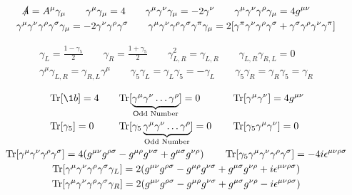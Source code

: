 \begin{gather*}
    \slashed{A} = A^\mu\gamma_\mu
    \qquad
    \gamma^\mu\gamma_\mu = 4
    \qquad
    \gamma^\mu\gamma^\nu\gamma_\mu = -2\gamma^\nu
    \qquad
    \gamma^\mu\gamma^\nu\gamma^\rho\gamma_\mu = 4g^{\mu\nu}
    \qquad
    \\
    \gamma^\mu\gamma^\nu\gamma^\rho\gamma^\sigma\gamma_\mu = -2\gamma^\nu\gamma^\rho\gamma^\sigma
    \qquad
    \gamma^\mu\gamma^\nu\gamma^\rho\gamma^\sigma\gamma^\pi\gamma_\mu = 2\qty[\gamma^\pi\gamma^\nu\gamma^\rho\gamma^\sigma + \gamma^\sigma\gamma^\rho\gamma^\nu\gamma^\pi]
\end{gather*}

\begin{gather*}
    \gamma_L = \frac{1 - \gamma_5}{2}
    \qquad
    \gamma_R = \frac{1 + \gamma_5}{2}
    \qquad
    \gamma_{L,R}^2 = \gamma_{L,R}
    \qquad
    \gamma_{L,R}\gamma_{R,L} = 0
    \\
    \gamma^\mu\gamma_{L,R} = \gamma_{R,L}\gamma^\mu
    \qquad
    \gamma_5\gamma_{L} = \gamma_{L}\gamma_5 = -\gamma_{L}
    \qquad
    \gamma_5\gamma_{R} = \gamma_{R}\gamma_5 = \gamma_{R}
\end{gather*}

\begin{gather*}
    \begin{alignedat}{3}
        &\Tr[\1b] = 4
        \qquad
        &&\mathrm{Tr}[\underbrace{\gamma^\mu\gamma^\nu\dots\gamma^\rho}_{\mathclap{\text{Odd Number}}}] = 0
        \qquad
        &&\Tr[\gamma^\mu\gamma^\nu] = 4g^{\mu\nu}
        \\
        &\Tr[\gamma_5] = 0
        \qquad
        &&\mathrm{Tr}[\gamma_5\underbrace{\gamma^\mu\gamma^\nu\dots\gamma^\rho}_{\mathclap{\text{Odd Number}}}] = 0
        \qquad
        &&\Tr[\gamma_5\gamma^\mu\gamma^\nu] = 0
    \end{alignedat}
    \\
    \Tr[\gamma^\mu\gamma^\nu\gamma^\rho\gamma^\sigma] = 4\qty(g^{\mu\nu}g^{\rho\sigma} - g^{\mu\rho}g^{\nu\sigma} + g^{\mu\sigma}g^{\nu\rho})
    \qquad
    \Tr[\gamma_5\gamma^\mu\gamma^\nu\gamma^\rho\gamma^\sigma] = -4i\epsilon^{\mu\nu\rho\sigma}
    \\
    \Tr[\gamma^\mu\gamma^\nu\gamma^\rho\gamma^\sigma\gamma_L] = 2\qty(g^{\mu\nu}g^{\rho\sigma} - g^{\mu\rho}g^{\nu\sigma} + g^{\mu\sigma}g^{\nu\rho} + i\epsilon^{\mu\nu\rho\sigma})
    \\
    \Tr[\gamma^\mu\gamma^\nu\gamma^\rho\gamma^\sigma\gamma_R] = 2\qty(g^{\mu\nu}g^{\rho\sigma} - g^{\mu\rho}g^{\nu\sigma} + g^{\mu\sigma}g^{\nu\rho} - i\epsilon^{\mu\nu\rho\sigma})
\end{gather*}
